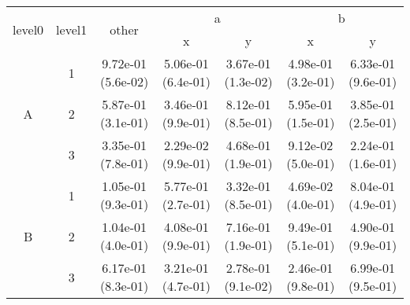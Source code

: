 \begin{tabular}{ccccccc}
\toprule
\multirow{2}{*}{level0} & \multirow{2}{*}{level1}& \multirow{2}{*}{other}&\multicolumn{2}{c}{a}&\multicolumn{2}{c}{b}\tabularnewline
\cmidrule(lr){4-5}
\cmidrule(lr){6-7}
&&&x&y&x&y\tabularnewline
\midrule
\multirow{3}{*}{A}&1& 9.72e-01 (5.6e-02)& 5.06e-01 (6.4e-01)& 3.67e-01 (1.3e-02)& 4.98e-01 (3.2e-01)& 6.33e-01 (9.6e-01)\tabularnewline
&2& 5.87e-01 (3.1e-01)& 3.46e-01 (9.9e-01)& 8.12e-01 (8.5e-01)& 5.95e-01 (1.5e-01)& 3.85e-01 (2.5e-01)\tabularnewline
&3& 3.35e-01 (7.8e-01)& 2.29e-02 (9.9e-01)& 4.68e-01 (1.9e-01)& 9.12e-02 (5.0e-01)& 2.24e-01 (1.6e-01)\tabularnewline
\midrule
\multirow{3}{*}{B}&1& 1.05e-01 (9.3e-01)& 5.77e-01 (2.7e-01)& 3.32e-01 (8.5e-01)& 4.69e-02 (4.0e-01)& 8.04e-01 (4.9e-01)\tabularnewline
&2& 1.04e-01 (4.0e-01)& 4.08e-01 (9.9e-01)& 7.16e-01 (1.9e-01)& 9.49e-01 (5.1e-01)& 4.90e-01 (9.9e-01)\tabularnewline
&3& 6.17e-01 (8.3e-01)& 3.21e-01 (4.7e-01)& 2.78e-01 (9.1e-02)& 2.46e-01 (9.8e-01)& 6.99e-01 (9.5e-01)\tabularnewline
\bottomrule
\end{tabular}
